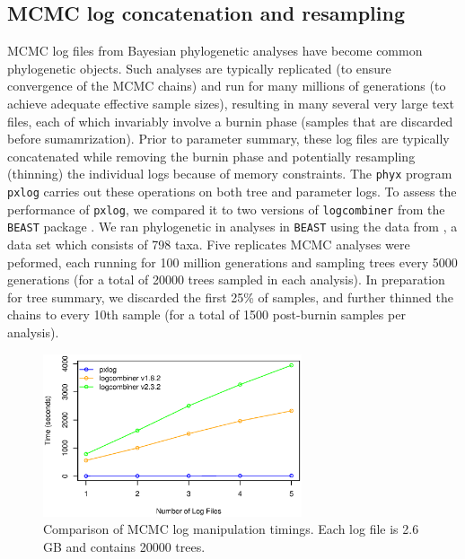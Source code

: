 \documentclass{article}
\begin{document}
\subsection{MCMC log concatenation and resampling}
MCMC log files from Bayesian phylogenetic analyses have become common
phylogenetic objects. Such analyses are typically replicated (to ensure
convergence of the MCMC chains) and run for many millions of generations
(to achieve adequate effective sample sizes), resulting in many several 
very large text files, each of which invariably involve a burnin phase
(samples that are discarded before sumamrization). Prior to parameter
summary, these log files are typically concatenated while removing the
burnin phase and potentially resampling (thinning) the individual logs
because of memory constraints. The \texttt{phyx} program \texttt{pxlog}
carries out these operations on both tree and parameter logs. To assess
the performance of \texttt{pxlog}, we compared it to two versions of
\texttt{logcombiner} from the \texttt{BEAST} package
\cite{DrummondRambaut2007}\cite{Bouckaert2014}.
We ran phylogenetic in analyses in \texttt{BEAST} using the data from
\cite{Magallon2015}, a data set which consists of 798 taxa. Five
replicates MCMC analyses were peformed, each running for 100 million
generations and sampling trees every 5000 generations (for a total of
20000 trees sampled in each analysis). In preparation for tree summary,
we discarded the first 25\% of samples, and further thinned the chains
to every 10th sample (for a total of 1500 post-burnin samples per analysis).

\begin{figure}[!h]
    \centering
    \includegraphics[width=3.0in]{log}
    \caption{Comparison of MCMC log manipulation timings. Each log file
    is 2.6 GB and contains 20000 trees.}
    \label{logfigure}
\label{fig:S3}
\end{figure}
\end{document}
